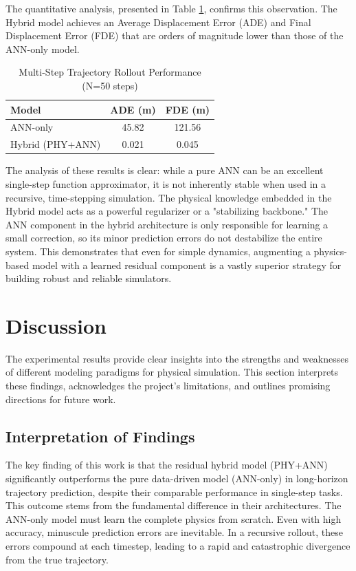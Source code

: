 \documentclass[conference]{IEEEtran}
\begin{document}
The quantitative analysis, presented in Table \ref{tab:multi_step}, confirms this observation. The Hybrid model achieves an Average Displacement Error (ADE) and Final Displacement Error (FDE) that are orders of magnitude lower than those of the ANN-only model.

\begin{table}[htbp]
\caption{Multi-Step Trajectory Rollout Performance (N=50 steps)}
\begin{center}
\begin{tabular}{|l|c|c|}
\hline
\textbf{Model} & \textbf{ADE (m)} & \textbf{FDE (m)} \\
\hline
ANN-only & 45.82 & 121.56 \\
Hybrid (PHY+ANN) & 0.021 & 0.045 \\
\hline
\end{tabular}
\label{tab:multi_step}
\end{center}
\end{table}

The analysis of these results is clear: while a pure ANN can be an excellent single-step function approximator, it is not inherently stable when used in a recursive, time-stepping simulation. The physical knowledge embedded in the Hybrid model acts as a powerful regularizer or a "stabilizing backbone." The ANN component in the hybrid architecture is only responsible for learning a small correction, so its minor prediction errors do not destabilize the entire system. This demonstrates that even for simple dynamics, augmenting a physics-based model with a learned residual component is a vastly superior strategy for building robust and reliable simulators.

\section{Discussion}
The experimental results provide clear insights into the strengths and weaknesses of different modeling paradigms for physical simulation. This section interprets these findings, acknowledges the project's limitations, and outlines promising directions for future work.

\subsection{Interpretation of Findings}
The key finding of this work is that the residual hybrid model (PHY+ANN) significantly outperforms the pure data-driven model (ANN-only) in long-horizon trajectory prediction, despite their comparable performance in single-step tasks. This outcome stems from the fundamental difference in their architectures. The ANN-only model must learn the complete physics from scratch. Even with high accuracy, minuscule prediction errors are inevitable. In a recursive rollout, these errors compound at each timestep, leading to a rapid and catastrophic divergence from the true trajectory.
\end{document}
